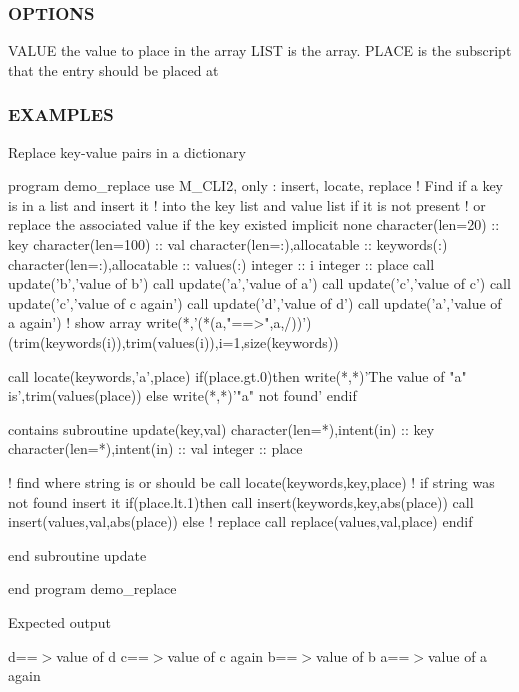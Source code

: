 \subsubsection*{O\+P\+T\+I\+O\+NS}

\begin{DoxyVerb}VALUE         the value to place in the array
LIST          is the array.
PLACE         is the subscript that the entry should be placed at
\end{DoxyVerb}


\subsubsection*{E\+X\+A\+M\+P\+L\+ES}

Replace key-\/value pairs in a dictionary \begin{DoxyVerb}program demo_replace
use M_CLI2, only  : insert, locate, replace
! Find if a key is in a list and insert it
! into the key list and value list if it is not present
! or replace the associated value if the key existed
implicit none
character(len=20)            :: key
character(len=100)           :: val
character(len=:),allocatable :: keywords(:)
character(len=:),allocatable :: values(:)
integer                      :: i
integer                      :: place
call update('b','value of b')
call update('a','value of a')
call update('c','value of c')
call update('c','value of c again')
call update('d','value of d')
call update('a','value of a again')
! show array
write(*,'(*(a,"==>",a,/))')(trim(keywords(i)),trim(values(i)),i=1,size(keywords))

call locate(keywords,'a',place)
if(place.gt.0)then
   write(*,*)'The value of "a" is',trim(values(place))
else
   write(*,*)'"a" not found'
endif

contains
subroutine update(key,val)
character(len=*),intent(in)  :: key
character(len=*),intent(in)  :: val
integer                      :: place

! find where string is or should be
call locate(keywords,key,place)
! if string was not found insert it
if(place.lt.1)then
   call insert(keywords,key,abs(place))
   call insert(values,val,abs(place))
else ! replace
   call replace(values,val,place)
endif

end subroutine update
\end{DoxyVerb}
 end program demo\+\_\+replace

Expected output

d==$>$value of d c==$>$value of c again b==$>$value of b a==$>$value of a again

